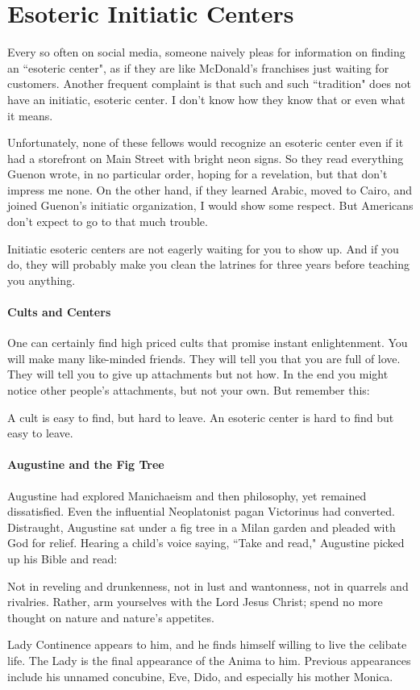 \section{Esoteric Initiatic Centers}

Every so often on social media, someone naively pleas for information on finding an ``esoteric center", as if they are like McDonald's franchises just waiting for customers. Another frequent complaint is that such and such ``tradition" does not have an initiatic, esoteric center. I don't know how they know that or even what it means.

Unfortunately, none of these fellows would recognize an esoteric center even if it had a storefront on Main Street with bright neon signs. So they read everything Guenon wrote, in no particular order, hoping for a revelation, but that don't impress me none. On the other hand, if they learned Arabic, moved to Cairo, and joined Guenon's initiatic organization, I would show some respect. But Americans don't expect to go to that much trouble.

Initiatic esoteric centers are not eagerly waiting for you to show up. And if you do, they will probably make you clean the latrines for three years before teaching you anything.

\paragraph{Cults and Centers}
One can certainly find high priced cults that promise instant enlightenment. You will make many like-minded friends. They will tell you that you are full of love. They will tell you to give up attachments but not how. In the end you might notice other people's attachments, but not your own. But remember this:

A cult is easy to find, but hard to leave. An esoteric center is hard to find but easy to leave.

\paragraph{Augustine and the Fig Tree}
Augustine had explored Manichaeism and then philosophy, yet remained dissatisfied. Even the influential Neoplatonist pagan Victorinus had converted. Distraught, Augustine sat under a fig tree in a Milan garden and pleaded with God for relief. Hearing a child's voice saying, ``Take and read," Augustine picked up his Bible and read:

\begin{quotex}
Not in reveling and drunkenness, not in lust and wantonness, not in quarrels and rivalries. Rather, arm yourselves with the Lord Jesus Christ; spend no more thought on nature and nature's appetites. 

\end{quotex}
Lady Continence appears to him, and he finds himself willing to live the celibate life. The Lady is the final appearance of the Anima to him. Previous appearances include his unnamed concubine, Eve, Dido, and especially his mother Monica.

